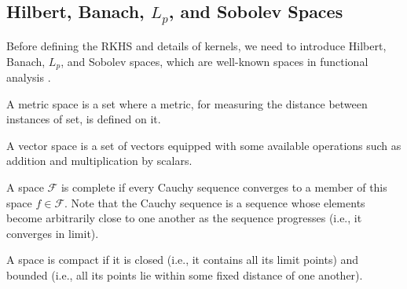 \documentclass[lang=cn,10pt]{gorgeousnbook}
\numberwithin{equation}{section}%
\numberwithin{figure}{section}%
\begin{document}
\subsection{Hilbert, Banach, $L_p$, and Sobolev Spaces}\label{section_spaces}

Before defining the RKHS and details of kernels, we need to introduce Hilbert, Banach, $L_p$, and Sobolev spaces, which are well-known spaces in functional analysis \cite{conway2007course}. 

\begin{definition}
A metric space is a set where a metric, for measuring the distance between instances of set, is defined on it. 
\end{definition}

\begin{definition}
A vector space is a set of vectors equipped with some available operations such as addition and multiplication by scalars. 
\end{definition}


\begin{definition}
A space $\mathcal{F}$ is complete if every Cauchy sequence converges to a member of this space $f \in \mathcal{F}$. Note that the Cauchy sequence is a sequence whose elements become arbitrarily close to one another as the sequence progresses (i.e., it converges in limit). 
\end{definition}

\begin{definition}\label{definition_compact_space}
A space is compact if it is closed (i.e., it contains all its limit points) and bounded (i.e., all its points lie within some fixed distance of one another). 
\end{definition}
\end{document}
